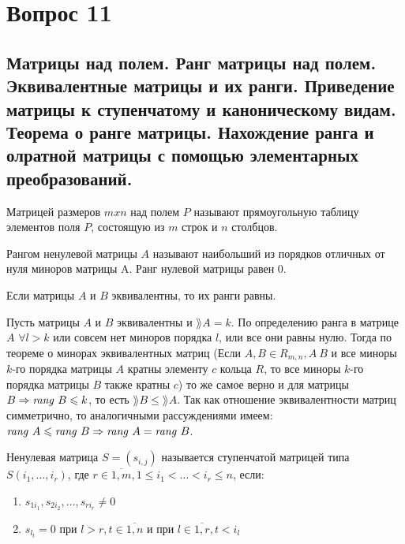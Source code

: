 \section{Вопрос 11}

\subsection{Матрицы над полем. Ранг матрицы над полем.
Эквивалентные матрицы и их ранги.
Приведение матрицы к ступенчатому и каноническому видам.
Теорема о ранге матрицы.
Нахождение ранга и олратной матрицы с помощью элементарных преобразований.}

\begin{defs}
  Матрицей размеров $mxn$ над полем $P$ называют прямоугольную таблицу
  элементов поля $P$, состоящую из $m$ строк и $n$ столбцов.
\end{defs}

\begin{defs}
  Рангом ненулевой матрицы  $A$ называют
  наибольший из порядков отличных от нуля миноров матрицы A.
  Ранг нулевой матрицы равен 0.
\end{defs}

\begin{proofs}
	Если матрицы $A$ и $B$ эквивалентны, то их ранги равны.
	\begin{dokvo}
    Пусть матрицы $A$ и $B$ эквивалентны и $\rang{A} = k$.
    По определению ранга в матрице $A$ $\forall l > k$ или совсем нет миноров порядка $l$, или все они равны нулю.
    Тогда по теореме о минорах эквивалентных матриц (Если $A,B \in R_{m,n}, A~B$ и все миноры $k$-го порядка матрицы $A$ кратны элементу $c$
    кольца $R$, то все миноры $k$-го порядка матрицы $B$ также кратны $c$) то же самое верно и для матрицы $B \Rightarrow \mathit{rang} \ B \leqslant k$, то есть $\rang{B} \leqslant \rang{A}$.
    Так как отношение эквивалентности матриц симметрично, то аналогичными рассуждениями имеем: $\mathit{rang} \ A \leqslant \mathit{rang} \ B \Rightarrow \mathit{rang} \ A = \mathit{rang} \ B$.
	\end{dokvo}
\end{proofs}

\begin{defs}
  Ненулевая матрица $S=(s_{i,j})$ называется ступенчатой матрицей типа $S(i_1, \ldots, i_r)$,
  где $r \in \overline{1,m}, 1 \leqslant i_1 < \ldots < i_r \leqslant n$, если:
  \begin{enumerate}
  	\item $s_{1i_1}, s_{2i_2}, \ldots, s_{ri_r} \neq 0$
  	\item $s_{l_t} = 0$ при $l > r, t \in \overline{1,n}$ и при $l \in \overline{1,r}, t < i_l$
  \end{enumerate}
\end{defs}

